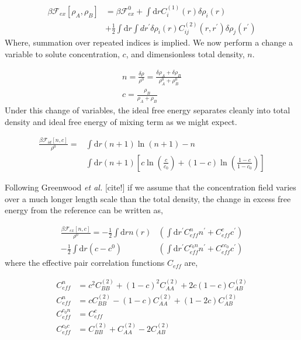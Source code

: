\documentclass[showkeys, prb, reprint]{revtex4-1}
\newcommand{\F}{\mathcal{F}}
\newcommand{\A}{\rho_A}
\newcommand{\B}{\rho_B}
\renewcommand{\d}{\mathrm{d}}
\renewcommand{\l}{\left}
\renewcommand{\r}{\right}
\newcommand{\f}{\frac}
\begin{document}
\begin{align}
	\beta\F_{ex}[\A, \B]  &= \beta \F_{ex}^0 + \int \d r C_i^{(1)}(r) \delta \rho_i(r) \\
		&+ \f{1}{2}\int \d r \int d r^\prime \delta \rho_i(r) C_{ij}^{(2)}(r, r^\prime) \delta \rho_j(r^\prime) \nonumber
\end{align}
Where, summation over repeated indices is implied. We now perform a change a variable to solute concentration, $c$, and dimensionless total density, $n$.

\begin{gather}
	n = \f{\delta \rho}{\rho^0} = \f{\delta \A + \delta \B}{\A^0 + \B^0} \\
	c = \f{\B}{\A + \B}
\end{gather}
Under this change of variables, the ideal free energy separates cleanly into total density and ideal free energy of mixing term as we might expect.

\begin{align}
	\f{\beta\F_{id}[n, c]}{\rho^0} = &\int \d r \l(n + 1\r) \ln\l(n + 1\r) - n  \\
	&\int \d r \l(n + 1 \r) \l[c\ln\l(\f{c}{c_0}\r) + (1 - c)\ln\l(\f{1 - c}{1 - c_0}\r)\r] \nonumber
\end{align}

Following Greenwood \textit{et al.} [cite!] if we assume that the concentration field varies over a much longer length scale than the total density, the change in excess free energy from the reference can be written as, 

\begin{align}
	\f{\beta \F_{ex}[n, c]}{\rho^0} = -\f{1}{2} \int \d r n(r) &\l( \int \d r^\prime C^n_{eff} n^\prime + C^c_{eff} c^\prime\r) \nonumber \\
	- \f{1}{2} \int \d r (c - c^0) &\l( \int \d r^\prime C^{c_0 n}_{eff} n^\prime + C^{c c_0}_{eff} c^\prime\r) 
\end{align}
where the effective pair correlation functions $C_{eff}$ are,

\begin{align}
	C_{eff}^n &= c^2 C_{BB}^{(2)} + (1 - c)^2 C_{AA}^{(2)} + 2c\l(1 - c\r) C_{AB}^{(2)} \\
	C_{eff}^n &= c C_{BB}^{(2)} - (1-c)C_{AA}^{(2)} + (1 - 2c) C_{AB}^{(2)} \\
	C_{eff}^{c_0 n} &= C_{eff}^c \\
	C_{eff}^{c_0 c} &= C_{BB}^{(2)} + C_{AA}^{(2)} - 2C_{AB}^{(2)}
\end{align}
\end{document}
